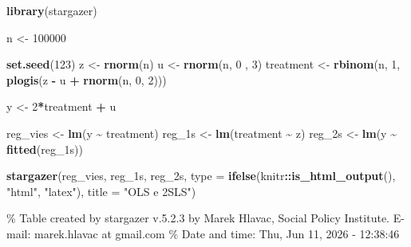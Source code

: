 \documentclass[
]{article}
\newenvironment{Shaded}{\begin{snugshade}}{\end{snugshade}}
\newcommand{\AttributeTok}[1]{\textcolor[rgb]{0.13,0.29,0.53}{#1}}
\newcommand{\DecValTok}[1]{\textcolor[rgb]{0.00,0.00,0.81}{#1}}
\newcommand{\FunctionTok}[1]{\textcolor[rgb]{0.13,0.29,0.53}{\textbf{#1}}}
\newcommand{\NormalTok}[1]{#1}
\newcommand{\OtherTok}[1]{\textcolor[rgb]{0.56,0.35,0.01}{#1}}
\newcommand{\SpecialCharTok}[1]{\textcolor[rgb]{0.81,0.36,0.00}{\textbf{#1}}}
\newcommand{\StringTok}[1]{\textcolor[rgb]{0.31,0.60,0.02}{#1}}
\begin{document}
\begin{Shaded}
\begin{Highlighting}[]
\FunctionTok{library}\NormalTok{(stargazer)}

\NormalTok{n }\OtherTok{\textless{}{-}} \DecValTok{100000}

\FunctionTok{set.seed}\NormalTok{(}\DecValTok{123}\NormalTok{)}
\NormalTok{z }\OtherTok{\textless{}{-}} \FunctionTok{rnorm}\NormalTok{(n)}
\NormalTok{u }\OtherTok{\textless{}{-}} \FunctionTok{rnorm}\NormalTok{(n, }\DecValTok{0}\NormalTok{ , }\DecValTok{3}\NormalTok{)}
\NormalTok{treatment }\OtherTok{\textless{}{-}} \FunctionTok{rbinom}\NormalTok{(n, }\DecValTok{1}\NormalTok{, }\FunctionTok{plogis}\NormalTok{(z }\SpecialCharTok{{-}}\NormalTok{ u }\SpecialCharTok{+} \FunctionTok{rnorm}\NormalTok{(n, }\DecValTok{0}\NormalTok{, }\DecValTok{2}\NormalTok{)))}

\NormalTok{y }\OtherTok{\textless{}{-}} \DecValTok{2}\SpecialCharTok{*}\NormalTok{treatment }\SpecialCharTok{+}\NormalTok{ u}

\NormalTok{reg\_vies }\OtherTok{\textless{}{-}} \FunctionTok{lm}\NormalTok{(y }\SpecialCharTok{\textasciitilde{}}\NormalTok{ treatment)}
\NormalTok{reg\_1s   }\OtherTok{\textless{}{-}} \FunctionTok{lm}\NormalTok{(treatment }\SpecialCharTok{\textasciitilde{}}\NormalTok{ z)}
\NormalTok{reg\_2s   }\OtherTok{\textless{}{-}} \FunctionTok{lm}\NormalTok{(y }\SpecialCharTok{\textasciitilde{}} \FunctionTok{fitted}\NormalTok{(reg\_1s))}

\FunctionTok{stargazer}\NormalTok{(reg\_vies, reg\_1s, reg\_2s,}
          \AttributeTok{type =} \FunctionTok{ifelse}\NormalTok{(knitr}\SpecialCharTok{::}\FunctionTok{is\_html\_output}\NormalTok{(), }\StringTok{"html"}\NormalTok{, }\StringTok{"latex"}\NormalTok{),}
          \AttributeTok{title =} \StringTok{"OLS e 2SLS"}\NormalTok{)}
\end{Highlighting}
\end{Shaded}

\% Table created by stargazer v.5.2.3 by Marek Hlavac, Social Policy Institute. E-mail: marek.hlavac at gmail.com
\% Date and time: Thu, Jun 11, 2026 - 12:38:46
\end{document}
